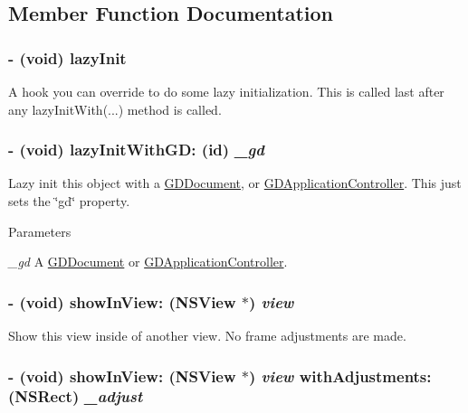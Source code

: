 \subsection{Member Function Documentation}
\hypertarget{interface_g_d_base_view_a640709524ac271aad9feda48f742b8fa}{
\subsubsection[{lazyInit}]{\setlength{\rightskip}{0pt plus 5cm}-\/ (void) lazyInit }}
\label{interface_g_d_base_view_a640709524ac271aad9feda48f742b8fa}


A hook you can override to do some lazy initialization. This is called last after any lazyInitWith(...) method is called. \hypertarget{interface_g_d_base_view_acadad5bd5ffc83d3c9b34c54461b2f4a}{
\subsubsection[{lazyInitWithGD:}]{\setlength{\rightskip}{0pt plus 5cm}-\/ (void) lazyInitWithGD: (id) {\em \_\-gd}}}
\label{interface_g_d_base_view_acadad5bd5ffc83d3c9b34c54461b2f4a}


Lazy init this object with a \hyperlink{interface_g_d_document}{GDDocument}, or \hyperlink{interface_g_d_application_controller}{GDApplicationController}. This just sets the \char`\"{}gd\char`\"{} property.


\begin{DoxyParams}{Parameters}
\item[{\em \_\-gd}]A \hyperlink{interface_g_d_document}{GDDocument} or \hyperlink{interface_g_d_application_controller}{GDApplicationController}. \end{DoxyParams}
\hypertarget{interface_g_d_base_view_abbf4c6090a17bfd07713de55b0904e0d}{
\subsubsection[{showInView:}]{\setlength{\rightskip}{0pt plus 5cm}-\/ (void) showInView: ({\bf NSView} $\ast$) {\em view}}}
\label{interface_g_d_base_view_abbf4c6090a17bfd07713de55b0904e0d}


Show this view inside of another view. No frame adjustments are made. \hypertarget{interface_g_d_base_view_adc1a971ea59f4d48174901c94c48e8a0}{
\subsubsection[{showInView:withAdjustments:}]{\setlength{\rightskip}{0pt plus 5cm}-\/ (void) showInView: ({\bf NSView} $\ast$) {\em view}\/ withAdjustments: (NSRect) {\em \_\-adjust}}}
\label{interface_g_d_base_view_adc1a971ea59f4d48174901c94c48e8a0}



